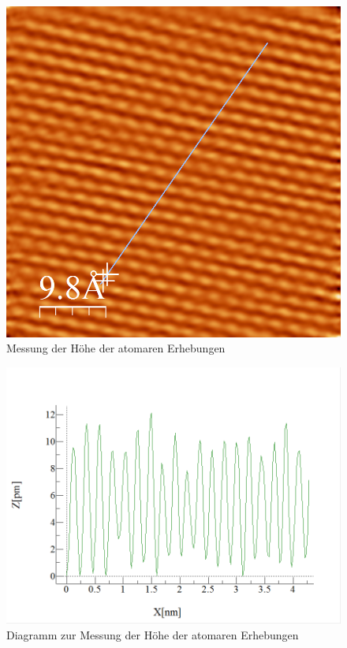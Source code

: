 \documentclass[10pt,a4paper]{article}
\begin{document}
\begin{figure}[h]
	\centering
	
	\includegraphics[scale = 0.4]{hohenmessung11.png}
	
	\caption{Messung der Höhe der atomaren Erhebungen}
	\label{Messungerh3}
\end{figure}

\begin{figure}[h]
	\centering
	
	\includegraphics[scale = 0.7]{hohenmessung1_diagramm.png}
	
	\caption{Diagramm zur Messung der Höhe der atomaren Erhebungen}
	\label{Messungerh4}
\end{figure}
\end{document}
